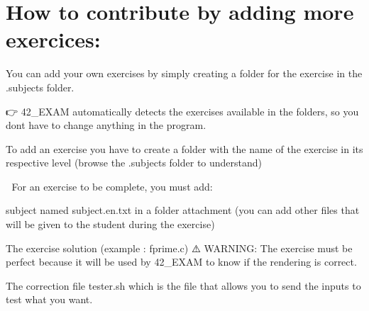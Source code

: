 \chapter{How to contribute by adding more exercices\+:}
\hypertarget{md__2_users_2thibault_2kdrive_21-_p_r_o_j_e_c_t_s_2_p-42_242-_e_x_a_m_242-_e_x_a_m_2_c_o_n_t_r_i_b_u_t_i_n_g}{}\label{md__2_users_2thibault_2kdrive_21-_p_r_o_j_e_c_t_s_2_p-42_242-_e_x_a_m_242-_e_x_a_m_2_c_o_n_t_r_i_b_u_t_i_n_g}
\label{md__2_users_2thibault_2kdrive_21-_p_r_o_j_e_c_t_s_2_p-42_242-_e_x_a_m_242-_e_x_a_m_2_c_o_n_t_r_i_b_u_t_i_n_g_autotoc_md0}%
%


You can add your own exercises by simply creating a folder for the exercise in the {\ttfamily .subjects} folder.

👉 42\+\_\+\+EXAM automatically detects the exercises available in the folders, so you don\textquotesingle{}t have to change anything in the program.

To add an exercise you have to create a folder with the name of the exercise in its respective level (browse the .subjects folder to understand)



🔖 For an exercise to be complete, you must add\+:


\begin{DoxyItemize}
\item {} subject named {\ttfamily subject.\+en.\+txt} in a folder {\ttfamily attachment} (you can add other files that will be given to the student during the exercise)
\item The exercise solution (example \+: fprime.\+c) ⚠️ WARNING\+: The exercise must be perfect because it will be used by 42\+\_\+\+EXAM to know if the rendering is correct.
\item The correction file {\ttfamily tester.\+sh} which is the file that allows you to send the inputs to test what you want.
\end{DoxyItemize}


\begin{DoxyCode}{0}
\DoxyCodeLine{\ |}
\DoxyCodeLine{\ |}
\DoxyCodeLine{\ |}
\DoxyCodeLine{\ |}

\end{DoxyCode}


